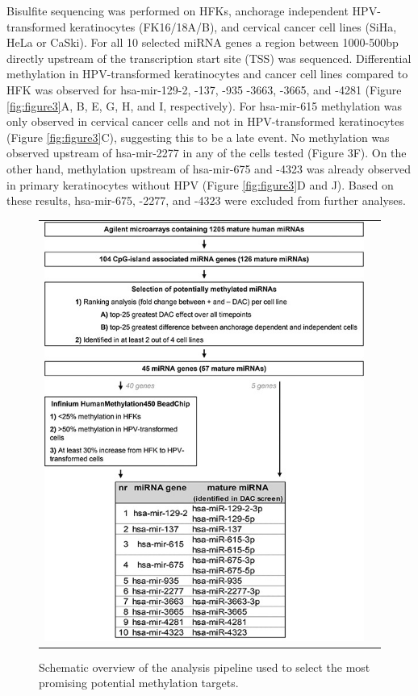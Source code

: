 Bisulfite sequencing was performed on HFKs, anchorage independent HPV-transformed keratinocytes (FK16/18A/B), and cervical cancer cell lines (SiHa, HeLa or CaSki). For all 10 selected miRNA genes a region between 1000-500bp directly upstream of the transcription start site (TSS) was sequenced. Differential methylation in HPV-transformed keratinocytes and cancer cell lines compared to HFK was observed for hsa-mir-129-2, -137, -935 -3663, -3665, and -4281 (Figure \ref{fig:figure3}A, B, E, G, H, and I, respectively). For hsa-mir-615 methylation was only observed in cervical cancer cells and not in HPV-transformed keratinocytes (Figure \ref{fig:figure3}C), suggesting this to be a late event. No methylation was observed upstream of hsa-mir-2277 in any of the cells tested (Figure 3F). On the other hand, methylation upstream of hsa-mir-675 and -4323 was already observed in primary keratinocytes without HPV (Figure \ref{fig:figure3}D and J). Based on these results, hsa-mir-675, -2277, and -4323 were excluded from further analyses. 
\begin{figure}[h!]
\centering
\begin{tabular}{cc} 
\includegraphics[scale=3]{Figure2.jpg}
\end{tabular}
\caption{Schematic overview of the analysis pipeline used to select the most promising potential methylation targets.}
\label{fig:figure2}
\end{figure}
